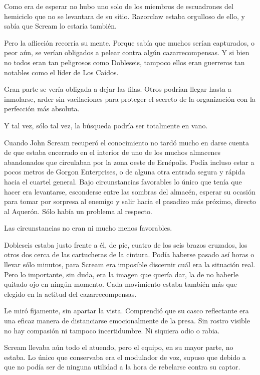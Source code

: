 Como era de esperar no hubo uno solo de los miembros de escuadrones del hemiciclo que no se levantara de su sitio. Razorclaw estaba orgulloso de ello, y sabía que Scream lo estaría también.

Pero la aflicción recorría su mente. Porque sabía que muchos serían capturados, o peor aún, se verían obligados a pelear contra algún cazarrecompensas. Y si bien no todos eran tan peligrosos como Dobleseis, tampoco ellos eran guerreros tan notables como el líder de Los Caídos.

Gran parte se vería obligada a dejar las filas. Otros podrían llegar hasta a inmolarse, arder sin vacilaciones para proteger el secreto de la organización con la perfección más absoluta.

Y tal vez, sólo tal vez, la búsqueda podría ser totalmente en vano.

\parbreak
Cuando John Scream recuperó el conocimiento no tardó mucho en darse cuenta de que estaba encerrado en el interior de uno de los muchos almacenes abandonados que circulaban por la zona oeste de Ernépolis. Podía incluso estar a pocos metros de Gorgon Enterprises, o de alguna otra entrada segura y rápida hacia el cuartel general. Bajo circunstancias favorables lo único que tenía que hacer era levantarse, esconderse entre las sombras del almacén, esperar su ocasión para tomar por sorpresa al enemigo y salir hacia el pasadizo más próximo, directo al Aquerón. Sólo había un problema al respecto.

Las circunstancias no eran ni mucho menos favorables.

Dobleseis estaba justo frente a él, de pie, cuatro de los seis brazos cruzados, los otros dos cerca de las cartucheras de la cintura. Podía haberse pasado así horas o llevar sólo minutos, para Scream era imposible discernir cuál era la situación real. Pero lo importante, sin duda, era la imagen que quería dar, la de no haberle quitado ojo en ningún momento. Cada movimiento estaba también más que elegido en la actitud del cazarrecompensas.

Le miró fijamente, sin apartar la vista. Comprendió que su casco reflectante era una eficaz manera de distanciarse emocionalmente de la presa. Sin rostro visible no hay compasión ni tampoco incertidumbre. Ni siquiera odio o rabia.

Scream llevaba aún todo el atuendo, pero el equipo, en su mayor parte, no estaba. Lo único que conservaba era el modulador de voz, supuso que debido a que no podía ser de ninguna utilidad a la hora de rebelarse contra su captor.


